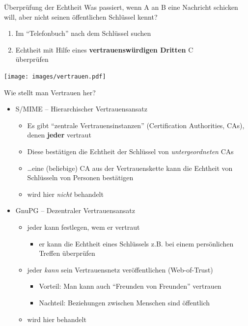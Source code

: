   \begin{frame}{Überprüfung der Echtheit}
  Was passiert, wenn A an B eine Nachricht schicken will, aber nicht seinen öffentlichen Schlüssel kennt?\\
  \begin{enumerate}
    \item Im ``Telefonbuch'' nach dem Schlüssel suchen
    \item Echtheit mit Hilfe eines \textbf{vertrauenswürdigen Dritten} C\\überprüfen
  \end{enumerate}
  \begin{center}
    \texttt{[image: images/vertrauen.pdf]}
  \end{center}
  \end{frame}

  \begin{frame}{Wie stellt man Vertrauen her?}
    \begin{itemize}
      \item S/MIME -- Hierarchischer Vertrauensansatz
      \begin{itemize}
        \item Es gibt ``zentrale Vertrauensinstanzen'' (Certification Authorities, CAs), denen \textbf{jeder} vertraut
        \item Diese bestätigen die Echtheit der Schlüssel von  \textit{untergeordneten} CAs
        \item \ldots eine (beliebige) CA aus der Vertrauenskette kann die Echtheit von Schlüsseln von Personen bestätigen
        \item wird hier \textit{nicht} behandelt
      \end{itemize}
      \item GnuPG -- Dezentraler Vertrauensansatz
      \begin{itemize}
        \item jeder kann festlegen, wem er vertraut
        \begin{itemize}
          \item er kann die Echtheit eines Schlüssels z.B. bei einem persönlichen Treffen überprüfen
        \end{itemize}
        \item jeder \textit{kann} sein Vertrauensnetz veröffentlichen (Web-of-Trust)
        \begin{itemize}
          \item Vorteil: Man kann auch ``Freunden von Freunden'' vertrauen
          \item Nachteil: Beziehungen zwischen Menschen sind öffentlich 
        \end{itemize}
        \item wird hier behandelt
      \end{itemize}
    \end{itemize}
  \end{frame}

